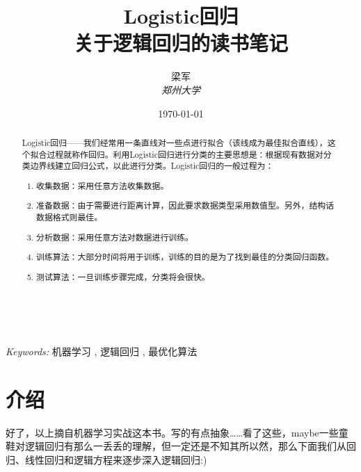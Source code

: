 \documentclass[a4paper, 11pt, hyperref, UTF8]{ctexart} %
\title{\textbf{Logistic回归}\\ %
关于逻辑回归的读书笔记} %
\author{\textsc{梁军} %
\\{\textit{郑州大学}}} %
\date{\today} %
\makeatletter
\renewcommand{\maketitle}{ %
\begin{flushleft} %
{\LARGE\@title} %

\vspace{50pt} %

{\large\@author} %
\\\@date %

\vspace{40pt} %
\end{flushleft}
}
\makeatother
\begin{document}
\maketitle %


\begin{abstract}
Logistic回归——我们经常用一条直线对一些点进行拟合（该线成为最佳拟合直线），这个拟合过程就称作回归。\cite{harrington2012machine}利用Logistic回归进行分类的主要思想是：根据现有数据对分类边界线建立回归公式，以此进行分类。Logistic回归的一般过程为：

\begin{enumerate}
\item 收集数据：采用任意方法收集数据。
\item 准备数据：由于需要进行距离计算，因此要求数据类型采用数值型。另外，结构话数据格式则最佳。
\item 分析数据：采用任意方法对数据进行训练。
\item 训练算法：大部分时间将用于训练，训练的目的是为了找到最佳的分类回归函数。
\item 测试算法：一旦训练步骤完成，分类将会很快。
\end{enumerate}

\end{abstract}

\hspace*{3,6mm}\textit{Keywords:} 机器学习 , 逻辑回归 , 最优化算法 %

\vspace{30pt} %


\section{介绍}

好了，以上摘自机器学习实战这本书。写的有点抽象……看了这些，maybe一些童鞋对逻辑回归有那么一丢丢的理解，但一定还是不知其所以然，那么下面我们从回归、线性回归和逻辑方程来逐步深入逻辑回归:)
\end{document}
